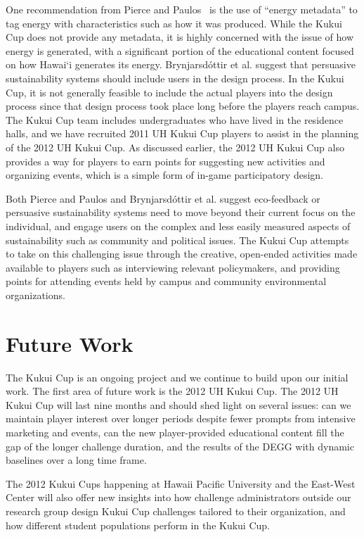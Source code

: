 \documentclass{sigchi}
\newcommand{\Hawaii}{Hawai`i\xspace}
\begin{document}
One recommendation from Pierce and Paulos~\cite{Pierce2012-BEM} is the use of ``energy metadata'' to tag energy with characteristics such as how it was produced. While the Kukui Cup does not provide any metadata, it is highly concerned with the issue of how energy is generated, with a significant portion of the educational content focused on how \Hawaii generates its energy. Brynjarsd\'{o}ttir et al. suggest that persuasive sustainability systems should include users in the design process. In the Kukui Cup, it is not generally feasible to include the actual players into the design process since that design process took place long before the players reach campus. The Kukui Cup team includes undergraduates who have lived in the residence halls, and we have recruited 2011 UH Kukui Cup players to assist in the planning of the 2012 UH Kukui Cup. As discussed earlier, the 2012 UH Kukui Cup also provides a way for players to earn points for suggesting new activities and organizing events, which is a simple form of in-game participatory design.

Both Pierce and Paulos and Brynjarsd\'{o}ttir et al. suggest eco-feedback or persuasive sustainability systems need to move beyond their current focus on the individual, and engage users on the complex and less easily measured aspects of sustainability such as community and political issues. The Kukui Cup attempts to take on this challenging issue through the creative, open-ended activities made available to players such as interviewing relevant policymakers, and providing points for attending events held by campus and community environmental organizations.


\section{Future Work}

The Kukui Cup is an ongoing project and we continue to build upon our initial work. The first area of future work is the 2012 UH Kukui Cup. The 2012 UH Kukui Cup will last nine months and should shed light on several issues: can we  maintain player interest over longer periods despite fewer prompts from intensive marketing and events, can the new player-provided educational content fill the gap of the longer challenge duration, and the results of the DEGG with dynamic baselines over a long time frame.

The 2012 Kukui Cups happening at Hawaii Pacific University and the East-West Center will also offer new insights into how challenge administrators outside our research group design Kukui Cup challenges tailored to their organization, and how different student populations perform in the Kukui Cup.
\end{document}
